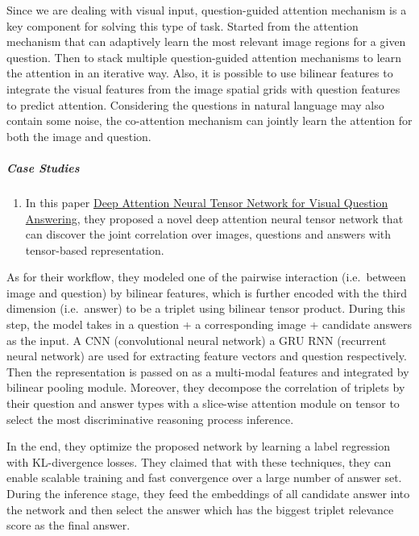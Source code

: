 \documentclass[]{book}
\providecommand{\tightlist}{%
  \setlength{\itemsep}{0pt}\setlength{\parskip}{0pt}}
\let\oldsubparagraph\subparagraph
\renewcommand{\subparagraph}[1]{\oldsubparagraph{#1}\mbox{}}
\theoremstyle{definition}
\theoremstyle{definition}
\theoremstyle{definition}
\theoremstyle{remark}
\begin{document}
Since we are dealing with visual input, question-guided attention
mechanism is a key component for solving this type of task. Started from
the attention mechanism that can adaptively learn the most relevant
image regions for a given question. Then to stack multiple
question-guided attention mechanisms to learn the attention in an
iterative way. Also, it is possible to use bilinear features to
integrate the visual features from the image spatial grids with question
features to predict attention. Considering the questions in natural
language may also contain some noise, the co-attention mechanism can
jointly learn the attention for both the image and question.

\subparagraph{Case Studies}\label{case-studies-1}

\begin{enumerate}
\def\labelenumi{\arabic{enumi}.}
\tightlist
\item
  In this paper
  \href{http://openaccess.thecvf.com/content_ECCV_2018/papers/Yalong_Bai_Deep_Attention_Neural_ECCV_2018_paper.pdf}{Deep
  Attention Neural Tensor Network for Visual Question Answering}, they
  proposed a novel deep attention neural tensor network that can
  discover the joint correlation over images, questions and answers with
  tensor-based representation.
\end{enumerate}

As for their workflow, they modeled one of the pairwise interaction
(i.e.~between image and question) by bilinear features, which is further
encoded with the third dimension (i.e.~answer) to be a triplet using
bilinear tensor product. During this step, the model takes in a question
+ a corresponding image + candidate answers as the input. A CNN
(convolutional neural network) a GRU RNN (recurrent neural network) are
used for extracting feature vectors and question respectively. Then the
representation is passed on as a multi-modal features and integrated by
bilinear pooling module. Moreover, they decompose the correlation of
triplets by their question and answer types with a slice-wise attention
module on tensor to select the most discriminative reasoning process
inference.

In the end, they optimize the proposed network by learning a label
regression with KL-divergence losses. They claimed that with these
techniques, they can enable scalable training and fast convergence over
a large number of answer set. During the inference stage, they feed the
embeddings of all candidate answer into the network and then select the
answer which has the biggest triplet relevance score as the final
answer.
\end{document}
